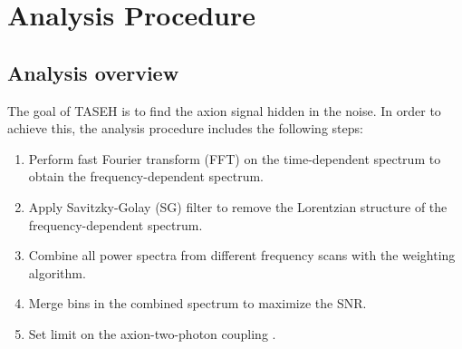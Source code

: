 \section{Analysis Procedure} \label{sec:ana}
    \subsection{Analysis overview}
The goal of TASEH is to find the axion signal hidden in the noise. In 
order to achieve this, the analysis procedure includes the following steps:
    \begin{enumerate}
        \item Perform fast Fourier transform (FFT) on the 
time-dependent spectrum to obtain the frequency-dependent spectrum.
        \item Apply Savitzky-Golay (SG) filter to remove the 
Lorentzian structure of the frequency-dependent spectrum.
        \item Combine all power spectra from different frequency scans with 
the weighting algorithm.
        \item Merge bins in the combined spectrum to maximize the SNR.
        \item Set limit on the axion-two-photon coupling \gagg.
    \end{enumerate}

